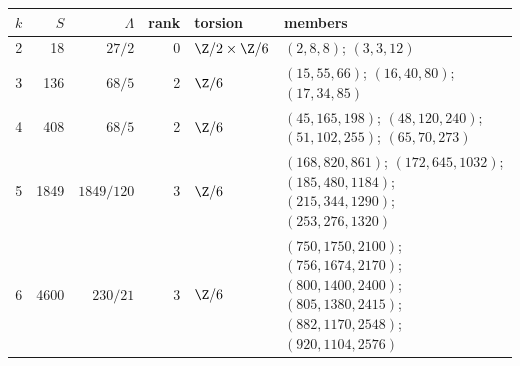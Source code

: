 \begin{tabular}{@{}rrrrl>{\raggedright\arraybackslash}p{}@{}}
\toprule
$k$ & $S$ & $\Lambda$ & rank & torsion & members\\
\midrule
2 & 18 & $27/2$ & 0 & $\Z/2\times\Z/6$ & $(2,8,8)$; $(3,3,12)$ \\
3 & 136 & $68/5$ & 2 & $\Z/6$ & $(15,55,66)$; $(16,40,80)$; $(17,34,85)$ \\
4 & 408 & $68/5$ & 2 & $\Z/6$ & $(45,165,198)$; $(48,120,240)$; $(51,102,255)$; $(65,70,273)$ \\
5 & 1849 & $1849/120$ & 3 & $\Z/6$ & $(168,820,861)$; $(172,645,1032)$; $(185,480,1184)$; $(215,344,1290)$; $(253,276,1320)$ \\
6 & 4600 & $230/21$ & 3 & $\Z/6$ & $(750,1750,2100)$; $(756,1674,2170)$; $(800,1400,2400)$; $(805,1380,2415)$; $(882,1170,2548)$; $(920,1104,2576)$ \\
\bottomrule
\end{tabular}
